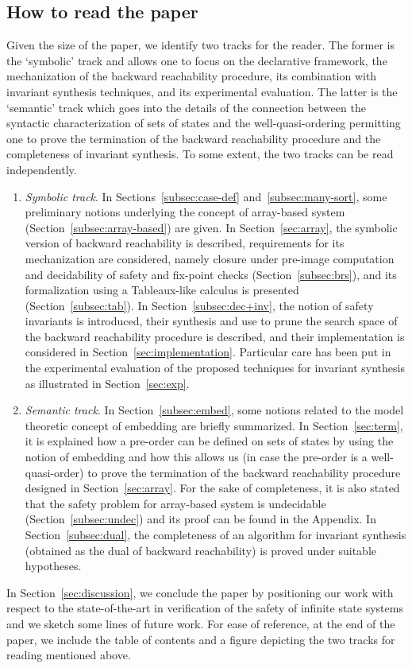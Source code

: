 \documentclass{LMCS}
\theoremstyle{plain}\newtheorem{assumption}[thm]{Assumption}
\theoremstyle{plain}\newtheorem{proposition}[thm]{Proposition}
\theoremstyle{plain}\newtheorem{property}[thm]{Property}
\theoremstyle{plain}\newtheorem{example}[thm]{Example}
\theoremstyle{plain}\newtheorem{claim}[thm]{Claim}
\theoremstyle{plain}\newtheorem{lemma}[thm]{Lemma}
\begin{document}
\subsection*{How to read the paper}

Given the size of the paper, we identify two tracks for the reader.
The former is the `symbolic' track and allows one to focus on the
declarative framework, the mechanization of the backward reachability
procedure, its combination with invariant synthesis techniques, and
its experimental evaluation.  The latter is the `semantic' track which
goes into the details of the connection between the syntactic
characterization of sets of states and the well-quasi-ordering
permitting one to prove the termination of the backward reachability
procedure and the completeness of invariant synthesis.  To some
extent, the two tracks can be read independently.
\begin{enumerate}[]
\item \emph{Symbolic track}.  In Sections~\ref{subsec:case-def}
  and~\ref{subsec:many-sort}, some preliminary notions underlying the
  concept of array-based system (Section~\ref{subsec:array-based}) are
  given.  In Section~\ref{sec:array}, the symbolic version of backward
  reachability is described, requirements for its mechanization are
  considered, namely closure under pre-image computation and
  decidability of safety and fix-point checks
  (Section~\ref{subsec:brs}), and its formalization using a
  Tableaux-like calculus is presented (Section~\ref{subsec:tab}).  In
  Section~\ref{subsec:dec+inv}, the notion of safety invariants is
  introduced, their synthesis and use to prune the search space of the
  backward reachability procedure is described,
and their implementation is
  considered in Section~\ref{sec:implementation}.  Particular care has
  been put in the experimental evaluation of the proposed techniques
  for invariant synthesis as illustrated in Section~\ref{sec:exp}.
\item \emph{Semantic track}.  In Section~\ref{subsec:embed}, some
  notions related to the model theoretic concept of embedding are
  briefly summarized.  In Section~\ref{sec:term}, it is explained how
a pre-order can be defined on sets of states by using the notion of
  embedding and how this allows us (in case the pre-order is a
  well-quasi-order) to prove the termination of the backward
  reachability procedure designed in Section~\ref{sec:array}.  For the
  sake of completeness, it is also stated that the safety problem for
  array-based system is undecidable (Section~\ref{subsec:undec}) and
  its proof can be found in the Appendix.  In
  Section~\ref{subsec:dual}, the completeness of an algorithm for
  invariant synthesis (obtained as the dual of backward reachability)
  is proved under suitable hypotheses.
\end{enumerate}
In Section~\ref{sec:discussion}, we conclude the paper by positioning
our work with respect to the state-of-the-art in verification of the
safety of infinite state systems and we sketch some lines of future
work.  For ease of reference, at the end of the paper, we include the
table of contents and a figure depicting the two tracks for reading
mentioned above.
\end{document}
